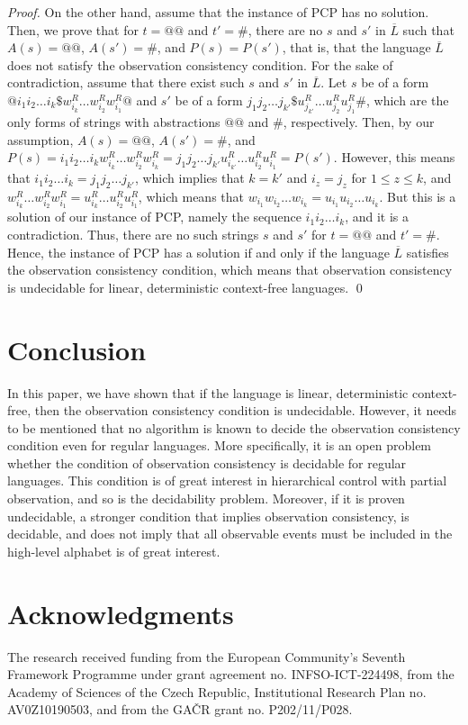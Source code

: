 \documentclass[preprint,1p,times]{elsarticle}
\begin{document}
\begin{proof}
    On the other hand, assume that the instance of PCP has no solution. Then, we prove that for $t=@@$ and $t'=\#$, there are no $s$ and $s'$ in $\overline{L}$ such that $A(s)=@@$, $A(s')=\#$, and $P(s)=P(s')$, that is, that the language $\overline{L}$ does not satisfy the observation consistency condition. For the sake of contradiction, assume that there exist such $s$ and $s'$ in $\overline{L}$. Let $s$ be of a form $@i_1i_2\ldots i_k\$w_{i_k}^R\ldots w_{i_2}^Rw_{i_1}^R@$ and $s'$ be of a form $j_1j_2\ldots j_{k'}\$u_{j_{k'}}^R\ldots u_{j_2}^Ru_{j_1}^R\#$, which are the only forms of strings with abstractions $@@$ and $\#$, respectively. Then, by our assumption, $A(s)=@@$, $A(s')=\#$, and $P(s)=i_1i_2\ldots i_kw_{i_k}^R\ldots w_{i_2}^Rw_{i_k}^R=j_1j_2\ldots j_{k'}u_{i_{k'}}^R\ldots u_{i_2}^Ru_{i_1}^R=P(s')$. However, this means that $i_1i_2\ldots i_k=j_1j_2\ldots j_{k'}$, which implies that $k=k'$ and $i_z=j_z$ for $1\le z\le k$, and $w_{i_k}^R\ldots w_{i_2}^Rw_{i_1}^R=u_{i_k}^R\ldots u_{i_2}^Ru_{i_1}^R$, which means that $w_{i_1}w_{i_2}\ldots w_{i_k}=u_{i_1}u_{i_2}\ldots u_{i_k}$. But this is a solution of our instance of PCP, namely the sequence $i_1 i_2 \ldots i_k$, and it is a contradiction. Thus, there are no such strings $s$ and $s'$ for $t=@@$ and $t'=\#$. Hence, the instance of PCP has a solution if and only if the language $\overline{L}$ satisfies the observation consistency condition, which means that observation consistency is undecidable for linear, deterministic context-free languages.
  \qed\end{proof}
  
\section{Conclusion}\label{conclusion}
  In this paper, we have shown that if the language is linear, deterministic context-free, then the observation consistency condition is undecidable. However, it needs to be mentioned that no algorithm is known to decide the observation consistency condition even for regular languages. More specifically, it is an open problem whether the condition of observation consistency is decidable for regular languages. This condition is of great interest in hierarchical control with partial observation, and so is the decidability problem. Moreover, if it is proven undecidable, a stronger condition that implies observation consistency, is decidable, and does not imply that all observable events must be included in the high-level alphabet is of great interest. 

\section*{Acknowledgments}
  The research received funding from the European Community's Seventh Framework Programme under grant agreement no. INFSO-ICT-224498, from the Academy of Sciences of the Czech Republic, Institutional Research Plan no. AV0Z10190503, and from the GA{\v C}R grant no. P202/11/P028.



\end{document}
